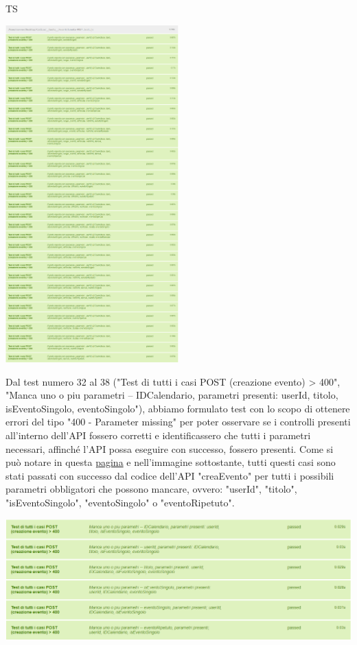 \begin{listaPersonale}{TS}
\begin{center}
                        \includegraphics[width=0.5\textwidth, height=0.63\textheight]{img/png/tests/EventoPost/200_PostEvento.png}
                \end{center}
                Dal test numero 32 al 38 ("Test di tutti i casi POST (creazione evento) > 400", "Manca uno o piu parametri -- IDCalendario, parametri presenti: userId, titolo, isEventoSingolo, eventoSingolo"), abbiamo formulato test con lo scopo di ottenere errori del tipo "400 - Parameter missing" per poter osservare se i controlli presenti all'interno dell'API fossero corretti e identificassero che tutti i parametri necessari, affinché l'API possa eseguire con successo, fossero presenti. Come si può notare in questa \href{https://plan-it.it/test-report.html} {pagina} e nell'immagine sottostante, tutti questi casi sono stati passati con successo dal codice dell'API "creaEvento" per tutti i possibili parametri obbligatori che possono mancare, ovvero: "userId", "titolo", "isEventoSingolo", "eventoSingolo" o "eventoRipetuto".
                \begin{center}
                        \includegraphics[width=1\textwidth, height=0.25\textheight]{img/png/tests/EventoPost/400_missingParameter_PostEvento.png}

\end{center}
\end{listaPersonale}
